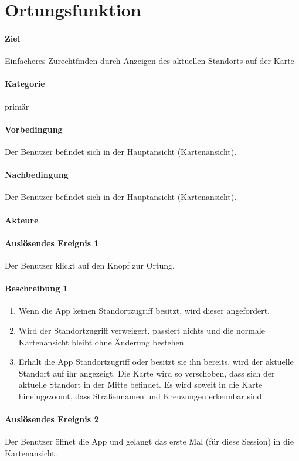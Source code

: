 \section{Ortungsfunktion}
\label{Ortungsfunktion}
\paragraph{Ziel}
Einfacheres Zurechtfinden durch Anzeigen des aktuellen Standorts auf der Karte
\paragraph{Kategorie}
primär
\paragraph{Vorbedingung}
Der Benutzer befindet sich in der Hauptansicht (Kartenansicht).
\paragraph{Nachbedingung}
Der Benutzer befindet sich in der Hauptansicht (Kartenansicht).
\paragraph{Akteure}

\paragraph{Auslösendes Ereignis 1}
Der Benutzer klickt auf den Knopf zur Ortung.
\paragraph{Beschreibung 1}
\begin{enumerate}
    \item Wenn die App keinen Standortzugriff besitzt, wird dieser angefordert.
    \item Wird der Standortzugriff verweigert, passiert nichts und die normale Kartenansicht bleibt ohne Änderung bestehen.
    \item Erhält die App Standortzugriff oder besitzt sie ihn bereits, wird der aktuelle Standort auf ihr angezeigt. Die Karte wird so verschoben, dass sich der aktuelle Standort in der Mitte befindet. Es wird soweit in die Karte hineingezoomt, dass Straßennamen und Kreuzungen erkennbar sind.
\end{enumerate}

\paragraph{Auslösendes Ereignis 2}
Der Benutzer öffnet die App und gelangt das erste Mal (für diese Session) in die Kartenansicht.
